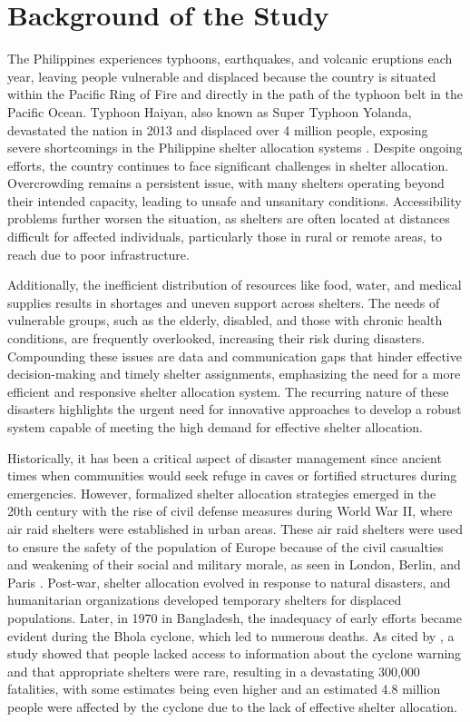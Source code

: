 \section{Background of the Study}

The Philippines experiences typhoons, earthquakes, and volcanic eruptions each year, leaving people vulnerable and displaced because the country is situated within the Pacific Ring of Fire and directly in the path of the typhoon belt in the Pacific Ocean. Typhoon Haiyan, also known as Super Typhoon Yolanda, devastated the nation in 2013 and displaced over 4 million people, exposing severe shortcomings in the Philippine shelter allocation systems \parencite{Iuchi2019}. Despite ongoing efforts, the country continues to face significant challenges in shelter allocation. Overcrowding remains a persistent issue, with many shelters operating beyond their intended capacity, leading to unsafe and unsanitary conditions. Accessibility problems further worsen the situation, as shelters are often located at distances difficult for affected individuals, particularly those in rural or remote areas, to reach due to poor infrastructure.


Additionally, the inefficient distribution of resources like food, water, and medical supplies results in shortages and uneven support across shelters. The needs of vulnerable groups, such as the elderly, disabled, and those with chronic health conditions, are frequently overlooked, increasing their risk during disasters. Compounding these issues are data and communication gaps that hinder effective decision-making and timely shelter assignments, emphasizing the need for a more efficient and responsive shelter allocation system. The recurring nature of these disasters highlights the urgent need for innovative approaches to develop a robust system capable of meeting the high demand for effective shelter allocation.

Historically, it has been a critical aspect of disaster management since ancient times when communities would seek refuge in caves or fortified structures during emergencies. However, formalized shelter allocation strategies emerged in the 20th century with the rise of civil defense measures during World War II, where air raid shelters were established in urban areas. These air raid shelters were used to ensure the safety of the population of Europe because of the civil casualties and weakening of their social and military morale, as seen in London, Berlin, and Paris \parencite{Flebus1941,Shakibamaesh2015}. Post-war, shelter allocation evolved in response to natural disasters, and humanitarian organizations developed temporary shelters for displaced populations. Later, in 1970 in Bangladesh, the inadequacy of early efforts became evident during the Bhola cyclone, which led to numerous deaths. As cited by \textcite{Hossain2018}, a study showed that people lacked access to information about the cyclone warning and that appropriate shelters were rare, resulting in a devastating 300,000 fatalities, with some estimates being even higher and an estimated 4.8 million people were affected by the cyclone due to the lack of effective shelter allocation.

